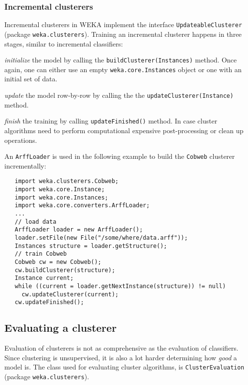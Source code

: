 \subsubsection*{Incremental clusterers}
Incremental clusterers in WEKA implement the interface
\texttt{UpdateableClusterer} (package \texttt{weka.clusterers}). Training an
incremental clusterer happens in three stages, similar to incremental
classifiers:
\begin{tight_enumerate}
	\item \textit{initialize} the model by calling the
\texttt{buildClusterer(Instances)} method. Once again, one can either use an
empty \texttt{weka.core.Instances} object or one with an initial set of data.
	\item \textit{update} the model row-by-row by calling the the
\texttt{updateClusterer(Instance)} method.
	\item \textit{finish} the training by calling
\texttt{updateFinished()} method. In case cluster algorithms need to perform
computational expensive post-processing or clean up operations.
\end{tight_enumerate}

\newpage

An \texttt{ArffLoader} is used in the following example to build the
\texttt{Cobweb} clusterer incrementally:
\begin{verbatim}
   import weka.clusterers.Cobweb;
   import weka.core.Instance;
   import weka.core.Instances;
   import weka.core.converters.ArffLoader;
   ...
   // load data
   ArffLoader loader = new ArffLoader();
   loader.setFile(new File("/some/where/data.arff"));
   Instances structure = loader.getStructure();
   // train Cobweb
   Cobweb cw = new Cobweb();
   cw.buildClusterer(structure);
   Instance current;
   while ((current = loader.getNextInstance(structure)) != null)
     cw.updateClusterer(current);
   cw.updateFinished();
\end{verbatim}

\newpage

\subsection{Evaluating a clusterer}
Evaluation of clusterers is not as comprehensive as the evaluation of
classifiers. Since clustering is unsupervised, it is also a lot harder
determining how \textit{good} a model is. The class used for evaluating cluster
algorithms, is \texttt{ClusterEvaluation} (package \texttt{weka.clusterers}).

